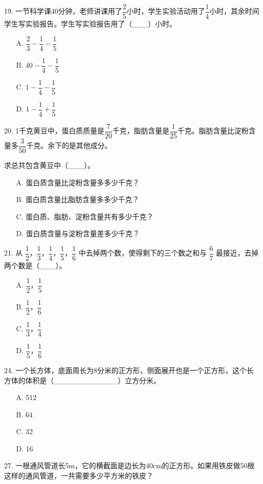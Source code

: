 \documentclass{article}
\begin{document}
\begin{CJK}{UTF8}{gbsn}
19. 一节科学课40分钟，老师讲课用了$\dfrac{2}{5}$小时，学生实验活动用了$\dfrac{1}{4}$小时，其余时间学生写实验报告。学生写实验报告用了（\_\_\_）小时。

\begin{itemize}
  \item[A.] $\dfrac{2}{3} - \dfrac{1}{4} - \dfrac{1}{5}$
  \item[B.] $40 - \dfrac{1}{4} - \dfrac{1}{5}$
  \item[C.] $1 - \dfrac{1}{4} - \dfrac{1}{5}$
  \item[D.] $1 - \dfrac{1}{4} + \dfrac{1}{5}$
\end{itemize}

20. 1千克黄豆中，蛋白质质量是$\dfrac{7}{20}$千克，脂肪含量是$\dfrac{1}{25}$千克。脂肪含量比淀粉含量多$\dfrac{3}{50}$千克。余下的是其他成分。

求总共包含黄豆中（\_\_\_）。

\begin{itemize}
  \item[A.] 蛋白质含量比淀粉含量多多少千克？
  \item[B.] 蛋白质含量比脂肪含量多多少千克？
  \item[C.] 蛋白质、脂肪、淀粉含量共有多少千克？
  \item[D.] 蛋白质含量与淀粉含量差多少千克？
\end{itemize}

21. 从 $\dfrac{1}{2}$，$\dfrac{1}{3}$，$\dfrac{1}{4}$，$\dfrac{1}{5}$，$\dfrac{1}{6}$ 中去掉两个数，使得剩下的三个数之和与 $\dfrac{6}{7}$ 最接近，去掉两个数是（\_\_\_）。

\begin{itemize}
  \item[A.] $\dfrac{1}{2}$，$\dfrac{1}{5}$
  \item[B.] $\dfrac{1}{2}$，$\dfrac{1}{6}$
  \item[C.] $\dfrac{1}{3}$，$\dfrac{1}{4}$
  \item[D.] $\dfrac{1}{5}$，$\dfrac{1}{6}$
\end{itemize}


24. 一个长方体，底面周长为8分米的正方形，侧面展开也是一个正方形，这个长方体的体积是（\_\_\_\_\_\_\_\_\_\_\_\_）立方分米。
\begin{itemize}
    \item[A.] 512
    \item[B.] 64
    \item[C.] 32
    \item[D.] 16
\end{itemize}

27. 一根通风管道长5m，它的横截面是边长为40cm的正方形。如果用铁皮做50根这样的通风管道，一共需要多少平方米的铁皮？\par


\end{CJK}
\end{document}
